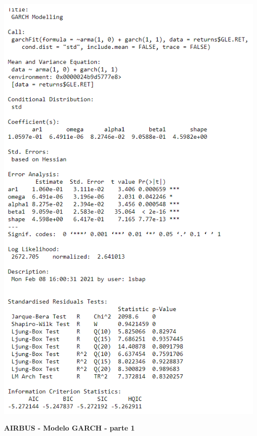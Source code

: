 \documentclass[
  12pt,
  a4paper,
  openany]{book}
\begin{document}
\begin{center}
\begin{minipage}{0.90\linewidth}
    \centering
    \includegraphics[width=2\textwidth]{image/garchgle.png}
\end{minipage}
\end{center}

\newpage

\begin{center}
 {\normalfont\Large\bfseries AIRBUS - Modelo GARCH - parte 1}
\end{center}
\end{document}
